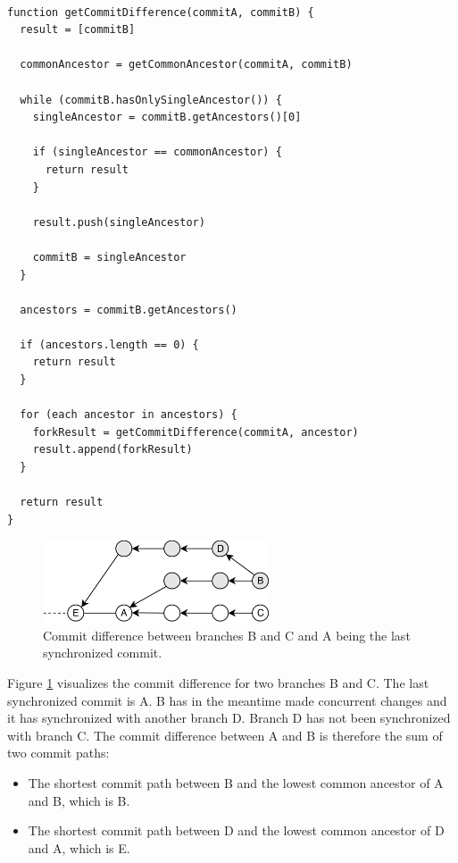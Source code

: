 \begin{lstlisting}[caption=Detecting commit history difference, label=commit-difference]

function getCommitDifference(commitA, commitB) {
  result = [commitB]

  commonAncestor = getCommonAncestor(commitA, commitB)

  while (commitB.hasOnlySingleAncestor()) {
    singleAncestor = commitB.getAncestors()[0]

    if (singleAncestor == commonAncestor) {
      return result
    }

    result.push(singleAncestor)

    commitB = singleAncestor
  }

  ancestors = commitB.getAncestors()

  if (ancestors.length == 0) {
    return result
  }

  for (each ancestor in ancestors) {
    forkResult = getCommitDifference(commitA, ancestor)
    result.append(forkResult)
  }

  return result
}

\end{lstlisting}

\begin{figure}[H]
  \centering
  \includegraphics[width=0.6\textwidth]{img/new-commits}
  \caption{Commit difference between branches B and C and A being the last synchronized commit.}
  \label{fig:histo.new-commits}
\end{figure}

Figure \ref{fig:histo.new-commits} visualizes the commit difference for two branches B and C.
The last synchronized commit is A.
B has in the meantime made concurrent changes and it has synchronized with another branch D.
Branch D has not been synchronized with branch C.
The commit difference between A and B is therefore the sum of two commit paths:\\

\begin{itemize}
\item The shortest commit path between B and the lowest common ancestor of A and B, which is B.
\item The shortest commit path between D and the lowest common ancestor of D and A, which is E.
\end{itemize}


